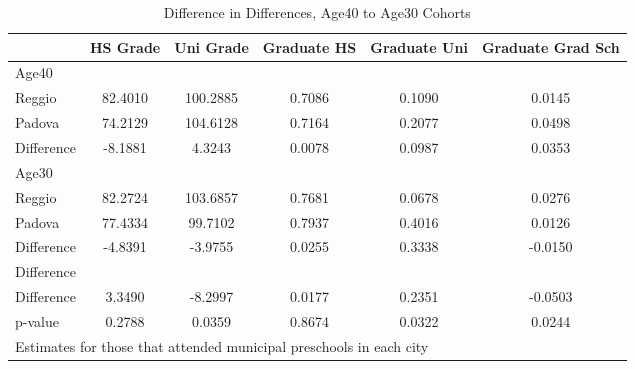 \begin{table}[htbp]\centering
\caption{Difference in Differences, Age40 to Age30 Cohorts}
\begin{tabular}{l*{5}{c}}
\hline\hline
            &    HS Grade&   Uni Grade& Graduate HS&Graduate Uni&Graduate Grad Sch\\
\hline
Age40       &            &            &            &            &            \\
Reggio      &     82.4010&    100.2885&      0.7086&      0.1090&      0.0145\\
Padova      &     74.2129&    104.6128&      0.7164&      0.2077&      0.0498\\
Difference  &     -8.1881&      4.3243&      0.0078&      0.0987&      0.0353\\
\hline
Age30       &            &            &            &            &            \\
Reggio      &     82.2724&    103.6857&      0.7681&      0.0678&      0.0276\\
Padova      &     77.4334&     99.7102&      0.7937&      0.4016&      0.0126\\
Difference  &     -4.8391&     -3.9755&      0.0255&      0.3338&     -0.0150\\
\hline
Difference  &            &            &            &            &            \\
Difference  &      3.3490&     -8.2997&      0.0177&      0.2351&     -0.0503\\
p-value     &      0.2788&      0.0359&      0.8674&      0.0322&      0.0244\\
\hline\hline
\multicolumn{6}{l}{\footnotesize Estimates for those that attended municipal preschools in each city}\\
\end{tabular}
\end{table}
